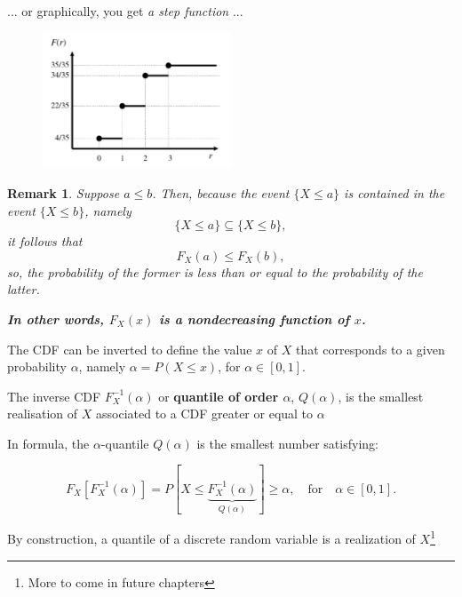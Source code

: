 \documentclass[smaller, handout]{beamer}\usepackage[]{graphicx}\usepackage[]{color}
\newtheorem{remark}{Remark}[section]
\begin{document}
\begin{frame}{\secname}
  \begin{example}[continued]
  ... or graphically, you get \textit{a step function} ...
  \begin{figure}[h!]
  \centering
  \includegraphics[width=0.5\textwidth,height=0.5\textheight]{img/repartbis.pdf}
  \end{figure}
  \end{example}
\end{frame}



\begin{frame}{\secname}
  \begin{remark}
  Suppose $a\leq b$. Then, because the event $\{X\leq a \}$ is contained in the
  event $\{X\leq b \}$, namely
  $$
  \{X\leq a \} \subseteq \{X\leq b \},
  $$
   it follows that
   $$F_X(a) \leq F_X(b),
   $$
  so, the probability of the former is less than or equal to the probability
  of the latter. \\
  \vspace{0.5cm}
  \begin{center}
  \textbf{In other words, $F_X(x)$ is a nondecreasing function of $x$.}
  \end{center}
  \end{remark}
\end{frame}

\begin{frame}{\secname}
  \begin{definition} [Quantiles]

  The CDF can be inverted to define the value $x$ of $X$ that corresponds to a given probability $\alpha$, namely $\alpha = P (X \leq x )$, for $\alpha \in [0,1]$.

  \medskip

  The inverse CDF $F_X^{-1}(\alpha)$ or \textbf{quantile of order $\alpha$}, $Q(\alpha)$, is the smallest realisation of $X$ associated to a CDF greater or equal to $\alpha$

  In formula, the $\alpha$-quantile $Q(\alpha)$ is the smallest number satisfying:

  $$
  F_X [F^{-1}_X (\alpha)] = P[X \leq \underbrace{F^{-1}_X (\alpha)}_{Q(\alpha)}] \geq \alpha, \quad \text{for} \quad \alpha\in[0,1].
  $$

  By construction, a quantile of a discrete random variable is a realization of $X$\footnote{More to come in future chapters}
  \end{definition}
\end{frame}
\end{document}
